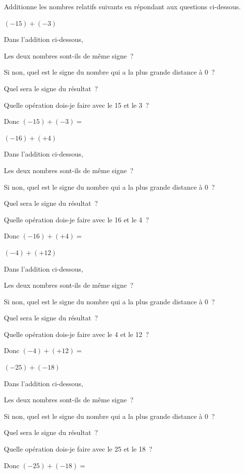 \documentclass[a4paper,11pt]{report}
\begin{document}
\begin{exop}
{
Additionne les nombres relatifs suivants en répondant aux questions ci-dessous.
\begin{tasks}[after-item-skip=0.2em]
\task $(-15)+(-3)$

Dans l'addition ci-dessous,

Les deux nombres sont-ils de même signe~? \hrulefill

Si non, quel est le signe du nombre qui a la plus grande distance à 0~? \hrulefill

Quel sera le signe du résultat~? \hrulefill

Quelle opération dois-je faire avec le 15 et le 3~? \hrulefill

Donc $(-15)+(-3)=$ \hrulefill

\task $(-16)+(+4)$

Dans l'addition ci-dessous,

Les deux nombres sont-ils de même signe~? \hrulefill

Si non, quel est le signe du nombre qui a la plus grande distance à 0~? \hrulefill

Quel sera le signe du résultat~? \hrulefill

Quelle opération dois-je faire avec le 16 et le 4~? \hrulefill

Donc $(-16)+(+4)=$ \hrulefill

\task $(-4)+(+12)$

Dans l'addition ci-dessous,

Les deux nombres sont-ils de même signe~? \hrulefill

Si non, quel est le signe du nombre qui a la plus grande distance à 0~? \hrulefill

Quel sera le signe du résultat~? \hrulefill

Quelle opération dois-je faire avec le 4 et le 12~? \hrulefill

Donc $(-4)+(+12)=$ \hrulefill

\task $(-25)+(-18)$

Dans l'addition ci-dessous,

Les deux nombres sont-ils de même signe~? \hrulefill

Si non, quel est le signe du nombre qui a la plus grande distance à 0~? \hrulefill

Quel sera le signe du résultat~? \hrulefill

Quelle opération dois-je faire avec le 25 et le 18~? \hrulefill

Donc $(-25)+(-18)=$ \hrulefill


\end{tasks}}
\end{exop}
\end{document}

